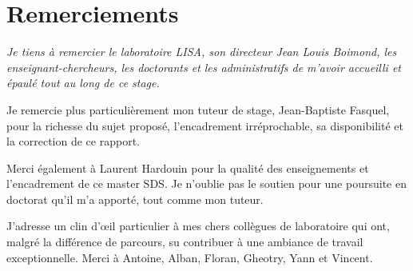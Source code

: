 
	\chapter*{Remerciements}
	\vspace*{\fill}

	{\it
	Je tiens à remercier le laboratoire LISA, son directeur Jean Louis Boimond, les enseignant-chercheurs, les doctorants et les administratifs de m'avoir accueilli et épaulé tout au long de ce stage.\vspace{1em}
	
	Je remercie plus particulièrement mon tuteur de stage, Jean-Baptiste Fasquel, pour la richesse du sujet proposé, l'encadrement irréprochable, sa disponibilité et la correction de ce rapport.\vspace{1em}
	
	Merci également à Laurent Hardouin pour la qualité des enseignements et l'encadrement de ce master SDS. Je n'oublie pas le soutien pour une poursuite en doctorat qu'il m'a apporté, tout comme mon tuteur.\vspace{1em}
	
	J'adresse un clin d'\oe{}il particulier à mes chers collègues de laboratoire qui ont, malgré la différence de parcours, su contribuer à une ambiance de travail exceptionnelle. Merci à Antoine, Alban, Floran, Gheotry, Yann et Vincent.
	
	}

	\vspace{\fill}


%	
	

